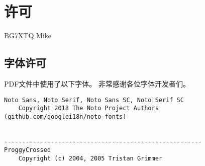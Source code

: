 \chapter*{许可}

\noindent {} BG7XTQ Mike

\section*{字体许可}

\noindent PDF文件中使用了以下字体。
非常感谢各位字体开发者们。

\begin{lstlisting}[numbers=none]
Noto Sans, Noto Serif, Noto Sans SC, Noto Serif SC
    Copyright 2018 The Noto Project Authors (github.com/googlei18n/noto-fonts)


-------------------------------------------------------
ProggyCrossed
    Copyright (c) 2004, 2005 Tristan Grimmer
\end{lstlisting}
